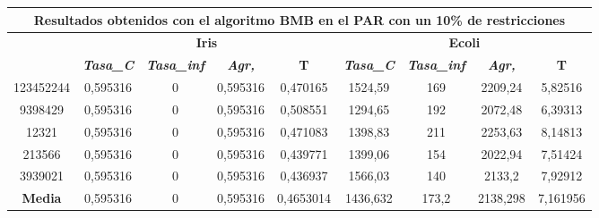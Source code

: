 \documentclass[12pt, spanish]{article}
\begin{document}
\begin{table}[H]
\begin{tabular}{|c|c|c|c|c|c|c|c|c|}
\hline
\multicolumn{9}{|c|}{\textbf{Resultados obtenidos con el algoritmo BMB en el PAR con un 10\% de restricciones}}                                                                                                   \\ \hline
\multirow{2}{*}{} & \multicolumn{4}{c|}{\textbf{Iris}}                                                            & \multicolumn{4}{c|}{\textbf{Ecoli}}                                                           \\ \cline{2-9} 
                  & \textit{\textbf{Tasa\_C}} & \textit{\textbf{Tasa\_inf}} & \textit{\textbf{Agr,}} & \textbf{T} & \textit{\textbf{Tasa\_C}} & \textit{\textbf{Tasa\_inf}} & \textit{\textbf{Agr,}} & \textbf{T} \\ \hline
123452244         & 0,595316                  & 0                           & 0,595316               & 0,470165   & 1524,59                   & 169                         & 2209,24                & 5,82516    \\ \hline
9398429           & 0,595316                  & 0                           & 0,595316               & 0,508551   & 1294,65                   & 192                         & 2072,48                & 6,39313    \\ \hline
12321             & 0,595316                  & 0                           & 0,595316               & 0,471083   & 1398,83                   & 211                         & 2253,63                & 8,14813    \\ \hline
213566            & 0,595316                  & 0                           & 0,595316               & 0,439771   & 1399,06                   & 154                         & 2022,94                & 7,51424    \\ \hline
3939021           & 0,595316                  & 0                           & 0,595316               & 0,436937   & 1566,03                   & 140                         & 2133,2                 & 7,92912    \\ \hline
\textbf{Media}    & 0,595316                  & 0                           & 0,595316               & 0,4653014  & 1436,632                  & 173,2                       & 2138,298               & 7,161956   \\ \hline
\end{tabular}
\end{table}
\end{document}
